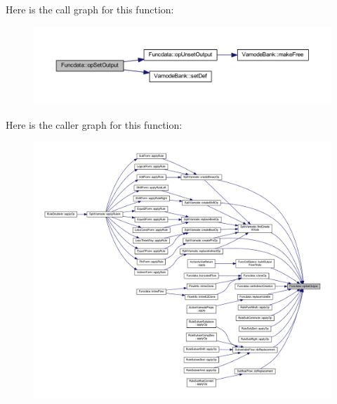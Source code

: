 Here is the call graph for this function\+:
\nopagebreak
\begin{figure}[H]
\begin{center}
\leavevmode
\includegraphics[width=350pt]{class_funcdata_ab2bd3523c574c5b303728ef4d880ec3a_cgraph}
\end{center}
\end{figure}
Here is the caller graph for this function\+:
\nopagebreak
\begin{figure}[H]
\begin{center}
\leavevmode
\includegraphics[width=350pt]{class_funcdata_ab2bd3523c574c5b303728ef4d880ec3a_icgraph}
\end{center}
\end{figure}
\mbox{\label{class_funcdata_a37b36505bab6f7c5676157288e65d5c6}} 
